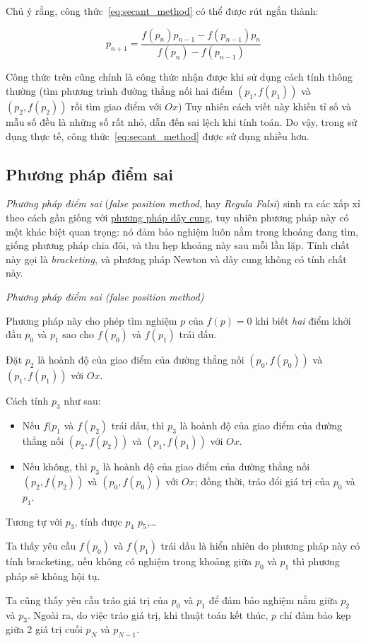 \documentclass[../../Lectures.tex]{subfiles}
\begin{document}
Chú ý rằng, công thức~\ref{eq:secant_method} có thể được rút ngắn thành:

\[p_{n + 1} = \frac{f(p_n) p_{n - 1} - f(p_{n - 1}) p_n}{f(p_n) - f(p_{n - 1})}\]

Công thức trên cũng chính là công thức nhận được khi sử dụng cách tính thông
thường (tìm phương trình đường thẳng nối hai điểm \((p_1, f(p_1))\) và \((p_2,
f(p_2))\) rồi tìm giao điểm với \(Ox\)) Tuy nhiên cách viết này khiến tỉ số và
mẫu số đều là những số rất nhỏ, dẫn đến sai lệch khi tính toán. Do vậy, trong sử
dụng thực tế, công thức~\ref{eq:secant_method} được sử dụng nhiều hơn.

\subsection{Phương pháp điểm sai}

\emph{Phương pháp điểm sai} (\emph{false position method}, hay \emph{Regula
Falsi}) sinh ra các xấp xỉ theo cách gần giống với
\hyperref[method:secant]{phương pháp dây cung}, tuy nhiên phương pháp này có một
khác biệt quan trọng: nó đảm bảo nghiệm luôn nằm trong khoảng đang tìm, giống
phương pháp chia đôi, và thu hẹp khoảng này sau mỗi lần lặp. Tính chất này gọi
là \emph{bracketing}, và phương pháp Newton và dây cung không có tính chất này.

\begin{method}
    \emph{Phương pháp điểm sai (false position method)}

    Phương pháp này cho phép tìm nghiệm \(p\) của \(f(p) = 0\) khi biết
    \emph{hai} điểm khởi đầu \(p_0\) và \(p_1\) sao cho \(f(p_0)\) và \(f(p_1)\)
    trái dấu.

    Đặt \(p_2\) là hoành độ của giao điểm của đường thẳng nối \((p_0, f(p_0))\)
    và \((p_1, f(p_1))\) với \(Ox\).

    Cách tính \(p_3\) như sau:

    \begin{itemize}
        \item Nếu \(f(p_1\) và \(f(p_2)\) trái dấu, thì \(p_3\) là hoành độ của
            giao điểm của đường thẳng nối \((p_2, f(p_2))\) và \((p_1, f(p_1))\)
            với \(Ox\).
        \item Nếu không, thì \(p_3\) là hoành độ của giao điểm của đường thẳng
            nối \((p_2, f(p_2))\) và \((p_0, f(p_0))\)  với \(Ox\); đồng thời,
            tráo đổi giá trị của \(p_0\) và \(p_1\).
    \end{itemize}

    Tương tự với \(p_3\), tính được \(p_4\) \(p_5\),\ldots
\end{method}

Ta thấy yêu cầu \(f(p_0)\) và \(f(p_1)\) trái dấu là hiển nhiên do phương pháp
này có tính bracketing, nếu không có nghiệm trong khoảng giữa \(p_0\) và \(p_1\)
thì phương pháp sẽ không hội tụ.

Ta cũng thấy yêu cầu tráo giá trị của \(p_0\) và \(p_1\) để đảm bảo nghiệm nằm
giữa \(p_2\) và \(p_3\). Ngoài ra, do việc tráo giá trị, khi thuật toán kết
thúc, \(p\) chỉ đảm bảo kẹp giữa 2 giá trị cuối \(p_N\) và \(p_{N - 1}\).
\end{document}
